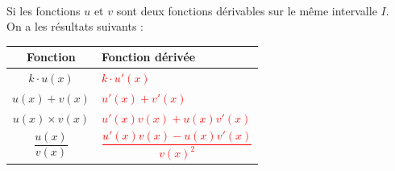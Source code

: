 \documentclass[11pt,a4paper]{article}
\begin{document}
\\
\vfill
Si les fonctions $u$ et $v$ sont deux fonctions dérivables sur le même intervalle $I$. \\[5pt]
 On a les résultats suivants : 
\vfill
\begin{center}
\renewcommand{\arraystretch}{3}

\begin{tabularx}{0.5\linewidth}{|c||>{\centering\arraybackslash}X|}
\hline 
Fonction & Fonction dérivée \\ 
\hline 
$k \cdot u(x)$ & \textcolor{red}{\textbf{$k \cdot u'(x)$}} \\ 
\hline 
$u(x) + v(x)$ & \textcolor{red}{\textbf{$u'(x) + v'(x)$}} \\ 
\hline 
$u(x) \times v(x)$ & \textcolor{red}{\textbf{$u'(x)v(x) + u(x)v'(x)$}} \\ 
\hline 
$\dfrac{u(x)}{v(x)}$ & \textcolor{red}{\textbf{$\dfrac{u'(x)v(x) - u(x)v'(x)}{v(x)^2}$}} \\ 
\hline 
\end{tabularx}

\end{center}
\vspace{5mm}
 \\
\end{document}
